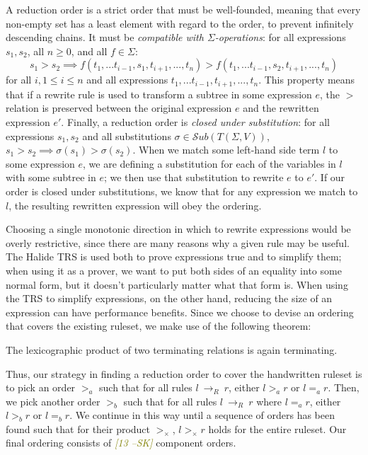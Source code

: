 \documentclass[acmsmall,review,anonymous]{acmart}\settopmatter{printfolios=true,printccs=false,printacmref=false}
\newcommand{\sak}[1]{\textcolor{olive}{\textit{[{#1} --SK]}}}
\newcommand{\rewrites}[0]{\:\rightarrow_{R}\:}
\begin{document}
A reduction order is a strict order that must be well-founded, meaning that every non-empty set has a least element with regard to the order, to prevent infinitely descending chains. It must be \emph{compatible with $\Sigma$-operations}: for all expressions $s_1, s_2$, all $n \geq 0$, and all $f \in \Sigma$:
\[
s_1 > s_2 \implies f(t_1,...t_{i-1},s_1,t_{i+1},...,t_n) > f(t_1,...t_{i-1},s_2,t_{i+1},...,t_n)
\]
for all $i, 1 \leq i \leq n$ and all expressions $t_1,...t_{i-1},t_{i+1},...,t_n$. This property means that if a rewrite rule is used to transform a subtree in some expression $e$, the $>$ relation is preserved between the original expression $e$ and the rewritten expression $e'$. Finally, a reduction order is \emph{closed under substitution}: for all expressions $s_1, s_2$ and all substitutions $\sigma \in \mathcal{S}ub(T(\Sigma,V))$, 
$s_1 > s_2 \implies \sigma(s_1) > \sigma(s_2)$. When we match some left-hand side term $l$ to some expression $e$, we are defining a substitution for each of the variables in $l$ with some subtree in $e$; we then use that substitution to rewrite $e$ to $e'$. If our order is closed under substitutions, we know that for any expression we match to $l$, the resulting rewritten expression will obey the ordering.

Choosing a single monotonic direction in which to rewrite expressions would be overly restrictive, since there are many reasons why a given rule may be useful. The Halide TRS is used both to prove expressions true and to simplify them; when using it as a prover, we want to put both sides of an equality into some normal form, but it doesn't particularly matter what that form is. When using the TRS to simplify expressions, on the other hand, reducing the size of an expression can have performance benefits. Since we choose to devise an ordering that covers the existing ruleset, we make use of the following theorem:

\begin{theorem}
The lexicographic product of two terminating relations is again terminating.
\end{theorem}

Thus, our strategy in finding a reduction order to cover the handwritten ruleset is to pick an order $>_a$ such that for all rules $l \rewrites r$, either $l >_a r$ or $l =_a r$. Then, we pick another order $>_b$ such that for all rules $l \rewrites r$ where $l =_a r$, either $l >_b r$ or $l =_b r$. We continue in this way until a sequence of orders has been found such that for their product $>_{\times}$, $l >_{\times} r$ holds for the entire ruleset.  Our final ordering consists of \sak{13} component orders.
\end{document}

